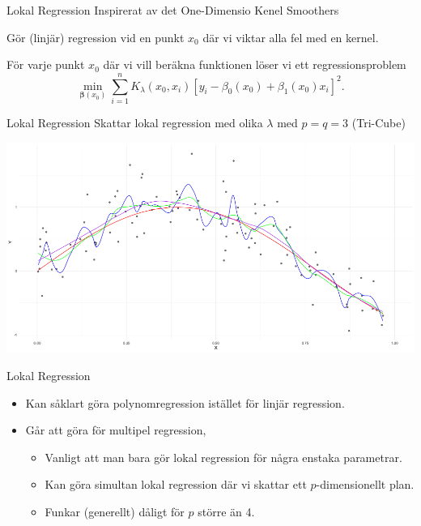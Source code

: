 \documentclass[10pt,english]{beamer}
\begin{document}
\begin{frame}{Lokal Regression}
    Inspirerat av det One-Dimensio Kenel Smoothers
    \begin{greenbox}
        Gör (linjär) regression vid en punkt $x_0$ där vi viktar alla fel med en kernel.
    \end{greenbox}

    För varje punkt $x_0$ där vi vill beräkna funktionen löser vi ett regressionsproblem
    \begin{equation*}
        \min_{\mathbf{\beta}(x_0)} \sum_{i=1}^{n} K_{\lambda}(x_0, x_i) [y_i - \beta_0(x_0) + \beta_1(x_0) x_i]^2.
    \end{equation*}

\end{frame}

\begin{frame}{Lokal Regression}
    Skattar lokal regression med olika $\lambda$ med $p = q = 3$ (Tri-Cube)

    \includegraphics[width = \textwidth]{fig/locreg.png}
\end{frame}

\begin{frame}{Lokal Regression}
    
    \begin{itemize}
        \item Kan såklart göra polynomregression istället för linjär regression.
        \item Går att göra för multipel regression,
        \begin{itemize}
            \item Vanligt att man bara gör lokal regression för några enstaka parametrar.
            \item Kan göra simultan lokal regression där vi skattar ett $p$-dimensionellt plan.
            \item Funkar (generellt) dåligt för $p$ större än 4.
        \end{itemize}
    \end{itemize}

\end{frame}
\end{document}
